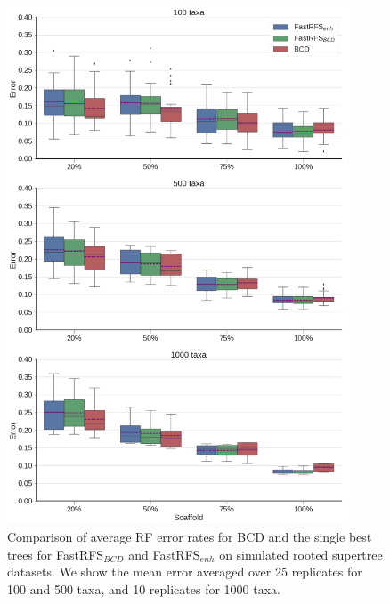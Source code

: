 \begin{figure}
  \centering
  \includegraphics[width=0.9\textwidth]{siesta-supp-figs/fastrfs_nosiesta_smidgenOG_error}
  \caption[Comparison of average RF error rates for  BCD and the single best trees for FastRFS$_{BCD}$ and FastRFS$_{enh}$ on simulated
    rooted supertree datasets.]{Comparison of average RF error rates for  BCD and the single best trees for FastRFS$_{BCD}$ and FastRFS$_{enh}$ on simulated
    rooted supertree datasets. We show the mean error
    averaged over 25 replicates for 100 and 500 taxa, and 10
    replicates for 1000 taxa.}
  \label{fig:supertree-consensus-comparison-6}
\end{figure}



